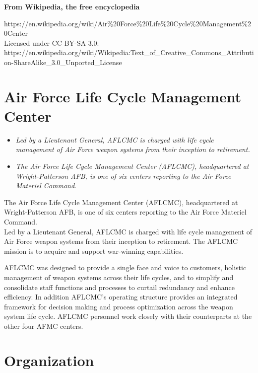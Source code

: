 \textbf{From Wikipedia, the free encyclopedia}

https://en.wikipedia.org/wiki/Air\%20Force\%20Life\%20Cycle\%20Management\%20Center\\
Licensed under CC BY-SA 3.0:\\
https://en.wikipedia.org/wiki/Wikipedia:Text\_of\_Creative\_Commons\_Attribution-ShareAlike\_3.0\_Unported\_License

\section{Air Force Life Cycle Management
Center}\label{air-force-life-cycle-management-center}

\begin{itemize}
\item
  \emph{Led by a Lieutenant General, AFLCMC is charged with life cycle
  management of Air Force weapon systems from their inception to
  retirement.}
\item
  \emph{The Air Force Life Cycle Management Center (AFLCMC),
  headquartered at Wright-Patterson AFB, is one of six centers reporting
  to the Air Force Materiel Command.}
\end{itemize}

The Air Force Life Cycle Management Center (AFLCMC), headquartered at
Wright-Patterson AFB, is one of six centers reporting to the Air Force
Materiel Command.\\
Led by a Lieutenant General, AFLCMC is charged with life cycle
management of Air Force weapon systems from their inception to
retirement. The AFLCMC mission is to acquire and support war-winning
capabilities.

AFLCMC was designed to provide a single face and voice to customers,
holistic management of weapon systems across their life cycles, and to
simplify and consolidate staff functions and processes to curtail
redundancy and enhance efficiency. In addition AFLCMC's operating
structure provides an integrated framework for decision making and
process optimization across the weapon system life cycle. AFLCMC
personnel work closely with their counterparts at the other four AFMC
centers.

\section{Organization}\label{organization}

